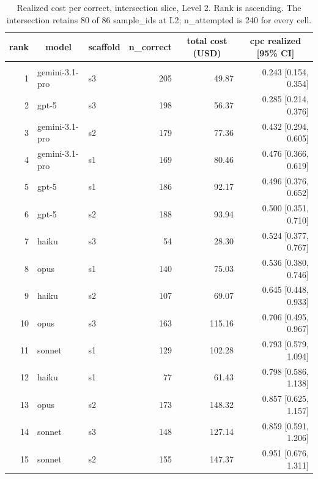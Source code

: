 \documentclass[10pt]{article} %
\begin{document}
        \begin{table}[t]
            \caption{Realized cost per correct, intersection slice, Level 2. Rank is ascending. The intersection retains 80 of 86 sample\_ids at L2; n\_attempted is 240 for every cell.}
        \label{tab:cpc_intersection_L2_ranked}
        \begin{center}
        \small
        \begin{tabular}{rllrrr}
            \multicolumn{1}{c}{\bf rank} & \multicolumn{1}{c}{\bf model} & \multicolumn{1}{c}{\bf scaffold} & \multicolumn{1}{c}{\bf n\_correct} & \multicolumn{1}{c}{\bf total cost (USD)} & \multicolumn{1}{c}{\bf cpc realized [95\% CI]} \\
            \hline \\
            1 & gemini-3.1-pro & s3 & 205 & 49.87 & 0.243 [0.154, 0.354] \\
            2 & gpt-5 & s3 & 198 & 56.37 & 0.285 [0.214, 0.376] \\
            3 & gemini-3.1-pro & s2 & 179 & 77.36 & 0.432 [0.294, 0.605] \\
            4 & gemini-3.1-pro & s1 & 169 & 80.46 & 0.476 [0.366, 0.619] \\
            5 & gpt-5 & s1 & 186 & 92.17 & 0.496 [0.376, 0.652] \\
            6 & gpt-5 & s2 & 188 & 93.94 & 0.500 [0.351, 0.710] \\
            7 & haiku & s3 & 54 & 28.30 & 0.524 [0.377, 0.767] \\
            8 & opus & s1 & 140 & 75.03 & 0.536 [0.380, 0.746] \\
            9 & haiku & s2 & 107 & 69.07 & 0.645 [0.448, 0.933] \\
            10 & opus & s3 & 163 & 115.16 & 0.706 [0.495, 0.967] \\
            11 & sonnet & s1 & 129 & 102.28 & 0.793 [0.579, 1.094] \\
            12 & haiku & s1 & 77 & 61.43 & 0.798 [0.586, 1.138] \\
            13 & opus & s2 & 173 & 148.32 & 0.857 [0.625, 1.157] \\
            14 & sonnet & s3 & 148 & 127.14 & 0.859 [0.591, 1.206] \\
            15 & sonnet & s2 & 155 & 147.37 & 0.951 [0.676, 1.311] \\
        \end{tabular}
        \end{center}
        \end{table}
\end{document}
